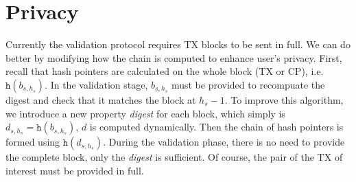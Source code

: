 \section{Privacy}
Currently the validation protocol requires TX blocks to be sent in full. We can
do better by modifying how the chain is computed to enhance user's privacy.
First, recall that hash pointers are calculated on the whole block (TX or CP),
i.e. $\texttt{h}(b_{s, h_s})$. In the validation stage, $b_{s, h_s}$ must be
provided to recompuate the digest and check that it matches the block at $h_s - 1$.
To improve this algorithm, we introduce a new property \emph{digest} for each
block, which simply is $d_{s, h_s} = \texttt{h}(b_{s, h_s})$, $d$ is computed
dynamically. Then the chain of hash pointers is formed using $\texttt{h}(d_{s,
  h_s})$. During the validation phase, there is no need to provide the complete
block, only the \emph{digest} is sufficient. Of course, the pair of the TX of
interest must be provided in full.




